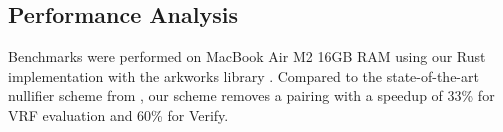     
    
    
    























\subsection{Performance Analysis}
Benchmarks were performed on MacBook Air M2 16GB RAM using our Rust implementation with the arkworks library \cite{arkworks_contributors_arkworks_2022}. Compared to the state-of-the-art nullifier scheme from \cite{tomescu2022utt}, our scheme removes a pairing with a speedup of 33\% for VRF evaluation and 60\% for Verify.

